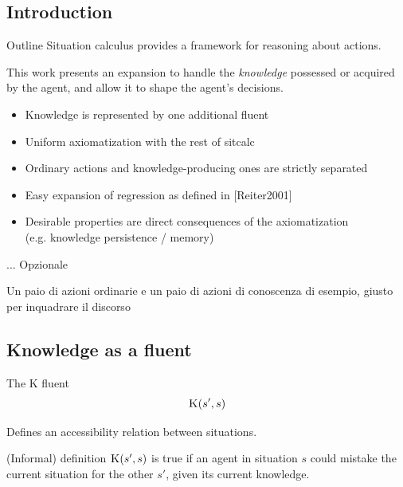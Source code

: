 

\subsection{Introduction}

\begin{frame}{Outline}
    Situation calculus provides a framework for reasoning about actions.

    This work presents an expansion to handle the \textit{knowledge} possessed or acquired by the agent,
    and allow it to shape the agent's decisions.
    \begin{itemize}%
        \item Knowledge is represented by one additional fluent
        \item Uniform axiomatization with the rest of sitcalc
        \item Ordinary actions and knowledge-producing ones are strictly separated
        \item Easy expansion of regression as defined in [Reiter2001]
        \item Desirable properties are direct consequences of the axiomatization \\
                (e.g. knowledge persistence / memory)
    \end{itemize}
\end{frame}

\begin{frame}{...}
    Opzionale

    Un paio di azioni ordinarie e un paio di azioni di conoscenza di esempio, giusto per inquadrare il discorso
\end{frame}

\subsection{Knowledge as a fluent}

\begin{frame}[fragile]{The K fluent}
    \huge
    \[ \textsc{K}(s', s) \]
    \normalsize

    Defines an accessibility relation between situations.


    \begin{block}{(Informal) definition}
        \( \textsc{K}(s',s) \) is true if an agent in situation \(s\)
        could mistake the current situation for the other \(s'\),
        given its current knowledge.
    \end{block}
\end{frame}

